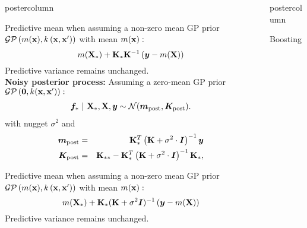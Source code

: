 \documentclass{beamer}
\newlength{\columnheight} %
\begin{document}
\begin{frame}[fragile]{}
\begin{columns}
\begin{column}{.31\textwidth}
\begin{beamercolorbox}[center]{postercolumn}
\begin{minipage}{.98\textwidth}
{\begin{myblock}{}
								Predictive mean when assuming a non-zero mean GP prior $\mathcal{GP}\left(m(\mathbf{x}), k\left(\mathbf{x}, \mathbf{x}^{\prime} \right) \right)$ with mean $m(\mathbf{x}):$ 
								$$
								m(\mathbf{X}_*) + \mathbf{K}_*\mathbf{K}^{-1}\left(\bm{y} - m(\mathbf{X})\right)
								$$
								Predictive variance remains unchanged. \\
								
								\textbf{Noisy posterior process:}
								Assuming a zero-mean GP prior $\mathcal{GP}\left(\bm{0}, k(\mathbf{x}, \mathbf{x}^\prime)\right):$ 
								\begin{eqnarray*}
									\bm{f}_* ~|~ \mathbf{X}_*, \mathbf{X}, \bm{y} \sim \mathcal{N}(\bm{m}_{\text{post}}, \bm{K}_\text{post}).
								\end{eqnarray*}
								with nugget $\sigma^2 $ and
								\begin{eqnarray*}
									\bm{m}_{\text{post}} &=& \mathbf{K}_{*}^{T} \left(\mathbf{K}+ \sigma^2 \cdot \bm{I}\right)^{-1}\bm{y} \\
									\bm{K}_\text{post} &=& \mathbf{K}_{**} - \mathbf{K}_*^T \left(\mathbf{K}  + \sigma^2 \cdot \bm{I}\right)^{-1}	\mathbf{K}_*,	
								\end{eqnarray*} 
								
								Predictive mean when assuming a non-zero mean GP prior $\mathcal{GP}\left(m(\mathbf{x}), k\left(\mathbf{x}, \mathbf{x}^{\prime} \right) \right)$ with mean $m(\mathbf{x}):$ 
								$$
								m(\mathbf{X}_*) + \mathbf{K}_*(\mathbf{K} +\sigma^2 \bm{I})^{-1}\left(\bm{y} - m(\mathbf{X})\right)
								$$
								Predictive variance remains unchanged.
							\end{myblock}
						}
					\end{minipage}
				\end{beamercolorbox}
			\end{column}
			\begin{column}{.31\textwidth}
				\begin{beamercolorbox}[center]{postercolumn}
					\begin{minipage}{.98\textwidth}
						\parbox[t][\columnheight]{\textwidth}{


						\begin{myblock}{Boosting}


\end{myblock}}
\end{minipage}
\end{beamercolorbox}
\end{column}
\end{columns}
\end{frame}
\end{document}
